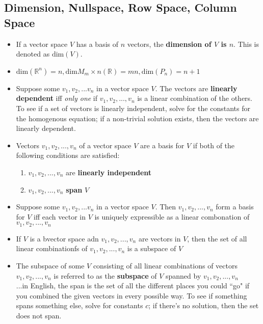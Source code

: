 \documentclass[10pt,letterpaper]{article}
\begin{document}
\subsection*{Dimension, Nullspace, Row Space, Column Space }
\begin{itemize}

\item If a vector space $V$ has a basis of $n$ vectors, the \textbf{dimension of $V$ is $n$}. This is denoted as $\mbox{dim}(V)$. 

\item $\mbox{dim}(\mathbb{R}^n)=n, \mbox{dim}M_m\times n(\mathbb{R})=mn, \mbox{dim}(P_n)=n+1$


\item Suppose some $v_1, v_2,...v_n$ in a vector space $V$. The vectors are \textbf{linearly dependent} iff \textit{only one} if $v_1,v_2,...,v_n$ is a linear combination of the others. To see if a set of vectors is linearly independent, solve for the constants for the homogenous equation; if a non-trivial solution exists, then the vectors are linearly dependent. 

\item Vectors $v_1,v_2,...,v_n $ of a vector space $V$ are a basis for $V$ if both of the following conditions are satisfied: 
\begin{enumerate}
\item $v_1,v_2,...,v_n$ are \textbf{linearly independent}
\item $v_1, v_2,...,v_n$ \textbf{span} $V$
\end{enumerate}

\item Suppose some $v_1, v_2,...v_n$ in a vector space $V$. Then $v_1, v_2,...,v_n$ form a basis for $V$ iff each vector in $V$ is uniquely expressible as a linear combonation of $v_1,v_2,...,v_n$

\item If $V$ is a bvector space adn $v_1, v_2, ...,v_n$ are vectors in $V$, then the set of all linear combinationfs of $v_1, v_2,...,v_n$ is a subspace of $V$ 

\item The subspace of some $V$ consisting of all linear combinations of vectors $v_1, v_2,...,v_n$ is referred to as the \textbf{subspace} of $V$ spanned by $v_1, v_2,...,v_n$ \\
...in English, the span is the set of all the different places you could ``go" if you combined the given vectors in every possible way. To see if something spans something else, solve for constants $c$; if there's no solution, then the set does not span. 


\end{itemize}
\end{document}
